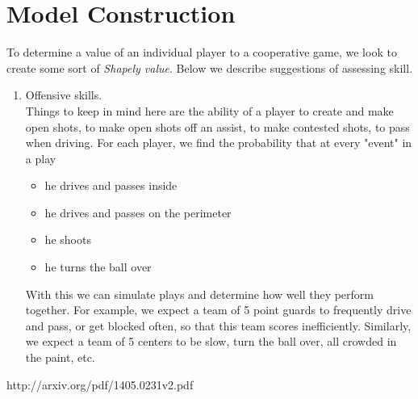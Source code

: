 \documentclass[11pt]{article}
\begin{document}
\section*{Model Construction}
To determine a value of an individual player to a cooperative game, we look to create some sort of {\em Shapely value}. Below we describe suggestions of assessing skill.
\begin{enumerate}
\item Offensive skills.\\
Things to keep in mind here are the ability of a player to create and make open shots, to make open shots off an assist, to make contested shots, to pass when driving. For each player, we find the probability that at every "event" in a play
\begin{itemize}
\item he drives and passes inside
\item he drives and passes on the perimeter
\item he shoots
\item he turns the ball over
\end{itemize}

With this we can simulate plays and determine how well they perform together. For example, we expect a team of 5 point guards to frequently drive and pass, or get blocked often, so that this team scores inefficiently. Similarly, we expect a team of 5 centers to be slow, turn the ball over, all crowded in the paint, etc. 
\end{enumerate}

\begin{thebibliography}{MA}


 {http://arxiv.org/pdf/1405.0231v2.pdf} \end{thebibliography}
\end{document}
